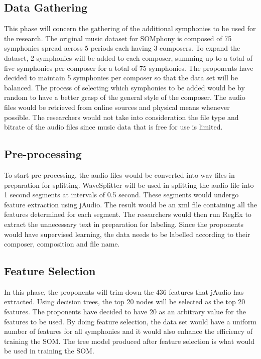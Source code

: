\subsection{Data Gathering}
This phase will concern the  gathering of the additional symphonies to be used for the research. The original music dataset for SOMphony is composed of 75 symphonies spread across 5 periods each having 3 composers. To expand the dataset, 2 symphonies will be added to each composer, summing up to a total of five symphonies per composer for a total of 75 symphonies. The proponents have decided to maintain 5 symphonies per composer so that the data set will be balanced. The process of selecting which symphonies to be added would be by random to have a better grasp of the general style of the composer. The audio files would be retrieved from online sources and physical means whenever possible. The researchers  would not take into consideration the file type and bitrate of the audio files since music data that is free for use is limited. 

\subsection{Pre-processing}
To start pre-processing,  the audio files would be converted into wav files in preparation for splitting. WaveSplitter will be used in splitting the audio file into 1 second segments at intervals of 0.5 second. These segments would undergo feature extraction using jAudio. The result would be an xml file containing all the features determined for each segment. The researchers would then run RegEx to extract the unnecessary text in preparation for labeling. Since the proponents would have supervised learning, the data needs to be labelled according to their composer, composition and file name.

\subsection{Feature Selection}
In this phase, the proponents will trim down the 436 features that jAudio has extracted. Using decision trees, the top 20 nodes will be selected as the top 20 features. The proponents have decided to have 20 as an arbitrary value for the features to be used. By doing feature selection, the data set would have a uniform number of features for all symphonies and it would also enhance the efficiency of training the SOM. The tree model produced after feature selection is what would be used in training the SOM.

